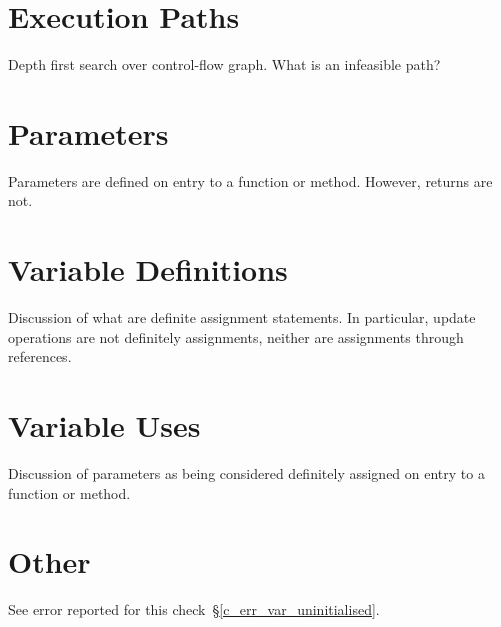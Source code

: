 \section{Execution Paths}

Depth first search over control-flow graph.  What is an infeasible path?


\section{Parameters}

Parameters are defined on entry to a function or method.  However, returns are not.

\section{Variable Definitions}

Discussion of what are definite assignment statements.  In particular, update operations are not definitely assignments, neither are assignments through references.

\section{Variable Uses}

Discussion of parameters as being considered definitely assigned on entry to a function or method.

\section{Other}

See error reported for this check~\S\ref{c_err_var_uninitialised}.

